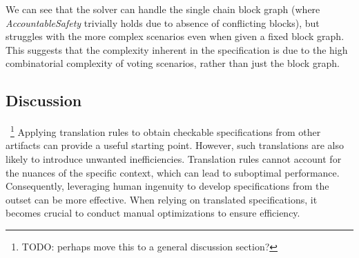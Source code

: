 We can see that the solver can handle the single chain block graph (where
\textit{AccountableSafety} trivially holds due to absence of conflicting
blocks), but struggles with the more complex scenarios even when given a fixed
block graph. This suggests that the complexity inherent in the specification is
due to the high combinatorial complexity of voting scenarios, rather than just
the block graph.

\subsection{Discussion}~\footnote{\color{red}TODO: perhaps move this to a general
discussion section?} Applying translation rules to obtain checkable
specifications from other artifacts can provide a useful starting point.
However, such translations are also likely to introduce unwanted
inefficiencies. Translation rules cannot account for the nuances of the specific
context, which can lead to suboptimal performance. Consequently, leveraging
human ingenuity to develop specifications from the outset can be more effective.
When relying on translated specifications, it becomes crucial to conduct
manual optimizations to ensure efficiency.
